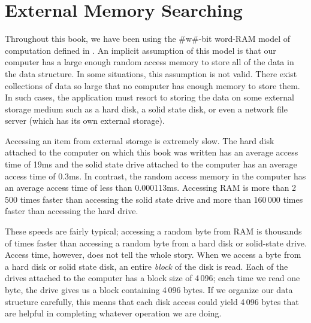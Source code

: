 \chapter{External Memory Searching}

Throughout this book, we have been using the #w#-bit word-RAM model
of computation defined in .   An implicit assumption of
this model is that our computer has a large enough random access memory
to store all of the data in the data structure.  In some situations,
this assumption is not valid.  There exist collections of data so large
that no computer has enough memory to store them.  In such cases, the
application must resort to storing the data on some external storage
medium such as a hard disk, a solid state disk, or even a network file
server (which has its own external storage).

%
%
%
%
Accessing an item from external storage is extremely slow.  The hard
disk attached to the computer on which this book was written has an
average access time of 19ms and the solid state drive attached to the
computer has an average access time of 0.3ms.  In contrast, the random
access memory in the computer has an average access time of less than
0.000113ms. Accessing RAM is more than 2\,500 times faster than accessing
the solid state drive and more than 160\,000 times faster than accessing
the hard drive.

% 
% 

These speeds are fairly typical;  accessing a random byte from RAM is
thousands of times faster than accessing a random byte from a hard disk
or solid-state drive.  Access time, however, does not tell the whole
story.  When we access a byte from a hard disk or solid state disk, an
entire \emph{block}
%
of the disk is read.  Each of the drives attached
to the computer has a block size of 4\,096; each time we read one byte,
the drive gives us a block containing 4\,096 bytes.  If we organize our
data structure carefully, this means that each disk access could yield
4\,096 bytes that are helpful in completing whatever operation we are doing.

